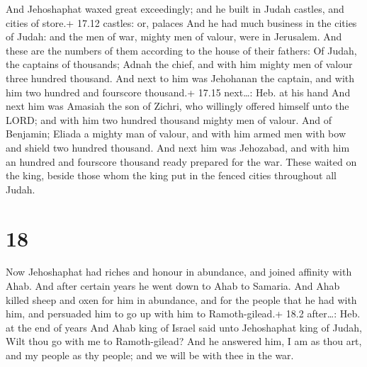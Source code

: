  And Jehoshaphat waxed great exceedingly; and he built in
Judah castles, and cities of store.+ 17.12 castles: or, palaces
 And he had much business in the cities of Judah: and the
men of war, mighty men of valour, were in Jerusalem.  And
these are the numbers of them according to the house of their fathers:
Of Judah, the captains of thousands; Adnah the chief, and with him
mighty men of valour three hundred thousand.  And next to
him was Jehohanan the captain, and with him two hundred and fourscore
thousand.+ 17.15 next\ldots: Heb. at his hand  And next him
was Amasiah the son of Zichri, who willingly offered himself unto the
LORD; and with him two hundred thousand mighty men of valour.
 And of Benjamin; Eliada a mighty man of valour, and with
him armed men with bow and shield two hundred thousand. 
And next him was Jehozabad, and with him an hundred and fourscore
thousand ready prepared for the war.  These waited on the
king, beside those whom the king put in the fenced cities throughout all
Judah.

\hypertarget{section-17}{%
\section{18}\label{section-17}}

 Now Jehoshaphat had riches and honour in abundance, and
joined affinity with Ahab.  And after certain years he went
down to Ahab to Samaria. And Ahab killed sheep and oxen for him in
abundance, and for the people that he had with him, and persuaded him to
go up with him to Ramoth-gilead.+ 18.2 after\ldots: Heb. at the end of
years  And Ahab king of Israel said unto Jehoshaphat king of
Judah, Wilt thou go with me to Ramoth-gilead? And he answered him, I am
as thou art, and my people as thy people; and we will be with thee in
the war.

